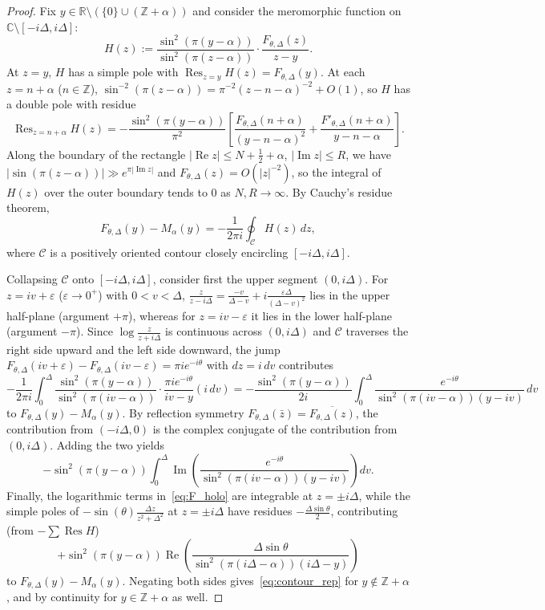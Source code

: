 \documentclass[11pt,a4paper]{amsart}
\theoremstyle{remark}
\numberwithin{equation}{section}
\newcommand{\R}{\mathbb{R}}
\newcommand{\C}{\mathbb{C}}
\newcommand{\Z}{\mathbb{Z}}
\DeclareMathOperator{\Res}{Res}
\begin{document}
\begin{proof}
Fix $y \in \R\setminus(\{0\}\cup(\Z+\alpha))$ and consider the meromorphic function on $\C\setminus[-i\Delta, i\Delta]$:
\[
  H(z) := \frac{\sin^2(\pi(y-\alpha))}{\sin^2(\pi(z-\alpha))}\cdot\frac{F_{\theta,\Delta}(z)}{z-y}.
\]
At $z = y$, $H$ has a simple pole with $\Res_{z=y} H(z) = F_{\theta,\Delta}(y)$. At each $z = n+\alpha$ ($n \in \Z$), $\sin^{-2}(\pi(z-\alpha)) = \pi^{-2}(z-n-\alpha)^{-2} + O(1)$, so $H$ has a double pole with residue
\[
  \Res_{z=n+\alpha} H(z) = -\frac{\sin^2(\pi(y-\alpha))}{\pi^2}\left[\frac{F_{\theta,\Delta}(n+\alpha)}{(y-n-\alpha)^2} + \frac{F'_{\theta,\Delta}(n+\alpha)}{y-n-\alpha}\right].
\]
Along the boundary of the rectangle $|\operatorname{Re} z| \le N + \frac{1}{2} + \alpha$, $|\operatorname{Im} z| \le R$, we have $|\sin(\pi(z-\alpha))| \gg e^{\pi|\operatorname{Im} z|}$ and $F_{\theta,\Delta}(z) = O(|z|^{-2})$, so the integral of $H(z)$ over the outer boundary tends to $0$ as $N, R \to \infty$. By Cauchy's residue theorem,
\[
  F_{\theta,\Delta}(y) - M_\alpha(y) = -\frac{1}{2\pi i}\oint_{\mathcal{C}} H(z)\,dz,
\]
where $\mathcal{C}$ is a positively oriented contour closely encircling $[-i\Delta, i\Delta]$.

Collapsing $\mathcal{C}$ onto $[-i\Delta, i\Delta]$, consider first the upper segment $(0, i\Delta)$. For $z = iv + \varepsilon$ ($\varepsilon \to 0^+$) with $0 < v < \Delta$, $\frac{z}{z-i\Delta} = \frac{-v}{\Delta-v} + i\frac{\varepsilon\Delta}{(\Delta-v)^2}$ lies in the upper half-plane (argument $+\pi$), whereas for $z = iv-\varepsilon$ it lies in the lower half-plane (argument $-\pi$). Since $\log\frac{z}{z+i\Delta}$ is continuous across $(0, i\Delta)$ and $\mathcal{C}$ traverses the right side upward and the left side downward, the jump $F_{\theta,\Delta}(iv+\varepsilon) - F_{\theta,\Delta}(iv-\varepsilon) = \pi i e^{-i\theta}$ with $dz = i\,dv$ contributes
\[
  -\frac{1}{2\pi i}\int_0^\Delta \frac{\sin^2(\pi(y-\alpha))}{\sin^2(\pi(iv-\alpha))}\cdot\frac{\pi i e^{-i\theta}}{iv-y}(i\,dv)
  = -\frac{\sin^2(\pi(y-\alpha))}{2i}\int_0^\Delta \frac{e^{-i\theta}}{\sin^2(\pi(iv-\alpha))(y-iv)}\,dv
\]
to $F_{\theta,\Delta}(y) - M_\alpha(y)$. By reflection symmetry $F_{\theta,\Delta}(\bar{z}) = \overline{F_{\theta,\Delta}(z)}$, the contribution from $(-i\Delta,0)$ is the complex conjugate of the contribution from $(0, i\Delta)$. Adding the two yields
\[
  -\sin^2(\pi(y-\alpha))\int_0^\Delta \operatorname{Im}\!\left(\frac{e^{-i\theta}}{\sin^2(\pi(iv-\alpha))(y-iv)}\right)dv.
\]
Finally, the logarithmic terms in~\eqref{eq:F_holo} are integrable at $z = \pm i\Delta$, while the simple poles of $-\sin(\theta)\frac{\Delta z}{z^2+\Delta^2}$ at $z = \pm i\Delta$ have residues $-\frac{\Delta\sin\theta}{2}$, contributing (from $-\sum\Res H$)
\[
  +\sin^2(\pi(y-\alpha))\operatorname{Re}\!\left(\frac{\Delta\sin\theta}{\sin^2(\pi(i\Delta-\alpha))(i\Delta-y)}\right)
\]
to $F_{\theta,\Delta}(y) - M_\alpha(y)$. Negating both sides gives~\eqref{eq:contour_rep} for $y \notin \Z+\alpha$, and by continuity for $y \in \Z+\alpha$ as well.
\end{proof}
\end{document}
